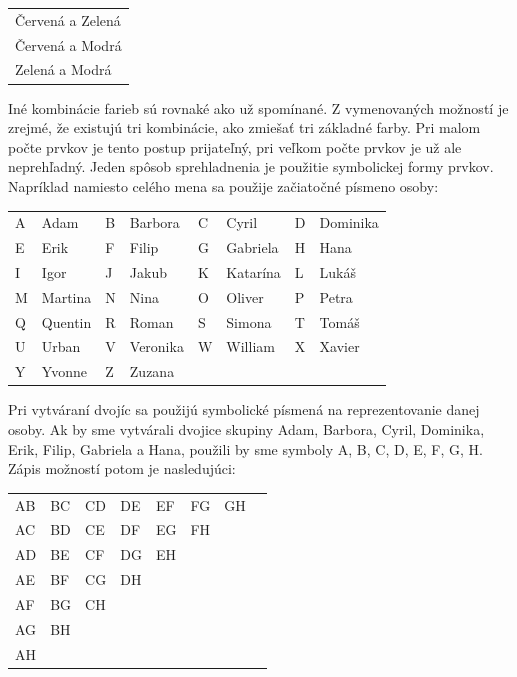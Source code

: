 \documentclass{report}
\begin{document}
\begin{table}[H]
  \centering
  \begin{tabular}{l}
    Červená a Zelená \\
    Červená a Modrá \\
    Zelená a Modrá
  \end{tabular}
\end{table}

\noindent
Iné kombinácie farieb sú rovnaké ako už spomínané. Z vymenovaných možností je zrejmé, že existujú tri kombinácie, ako zmiešať tri základné farby. Pri malom počte prvkov je tento postup prijateľný, pri veľkom počte prvkov je už ale neprehľadný. Jeden spôsob sprehladnenia je použitie symbolickej formy prvkov. Napríklad namiesto celého mena sa použije začiatočné písmeno osoby:

\begin{table}[H]
  \centering
  \begin{tabular}{ll ll ll ll}
    A & Adam     & B & Barbora  & C & Cyril    & D & Dominika \\
    E & Erik     & F & Filip    & G & Gabriela & H & Hana \\
    I & Igor     & J & Jakub    & K & Katarína & L & Lukáš \\
    M & Martina  & N & Nina     & O & Oliver   & P & Petra \\
    Q & Quentin  & R & Roman    & S & Simona   & T & Tomáš \\
    U & Urban    & V & Veronika & W & William  & X & Xavier \\
    Y & Yvonne   & Z & Zuzana   &   &          &   &         \\
  \end{tabular}
\end{table}

\noindent
Pri vytváraní dvojíc sa použijú symbolické písmená na reprezentovanie danej osoby. Ak by sme vytvárali dvojice skupiny Adam, Barbora, Cyril, Dominika, Erik, Filip, Gabriela a Hana, použili by sme symboly A, B, C, D, E, F, G, H. Zápis možností potom je nasledujúci:

\begin{table}[H]
  \centering
  \begin{tabular}{*{8}{l}}
    AB & BC & CD & DE & EF & FG & GH & \\
    AC & BD & CE & DF & EG & FH & & \\
    AD & BE & CF & DG & EH & & & \\
    AE & BF & CG & DH & & & & \\
    AF & BG & CH & & & & & \\
    AG & BH & & & & & & \\
    AH & & & & & & & \\
  \end{tabular}
\end{table}
\end{document}
